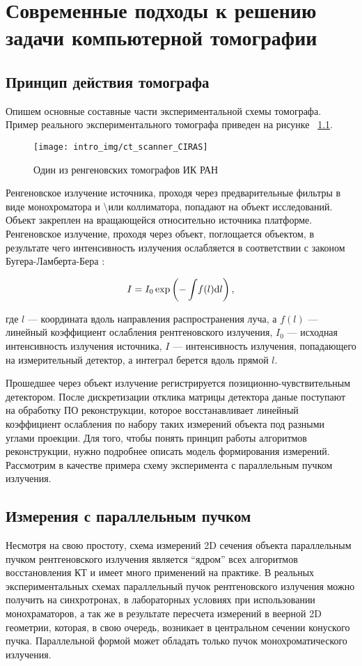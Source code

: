 \chapter{Современные подходы к решению задачи компьютерной томографии}
\section{Принцип действия томографа}
Опишем основные составные части экспериментальной схемы томографа.
Пример реального экспериментального томографа приведен на рисунке ~\ref{fig:ct_scanner}.

\begin{figure}
\centering
\label{fig:ct_scanner}
\texttt{[image: intro\_img/ct\_scanner\_CIRAS]}
\caption{Один из ренгеновских томографов ИК РАН}
\end{figure}

Ренгеновское излучение источника, проходя через предварительные фильтры в виде монохроматора и \textbackslash или коллиматора, попадают на объект исследований.
Объект закреплен на вращающейся относительно источника платформе.
Ренгеновское излучение, проходя через объект, поглощается объектом, в результате чего интенсивность излучения ослабляется в соответствии с законом Бугера-Ламберта-Бера \cite{sivukhin_blb}:

\begin{equation}
\notag
I = I_0 \exp\left( {-\int \! f(l) \mathrm d l }\right),
\end{equation}

где $l$ ---  координата вдоль направления распространения луча, а $f(l)$ --- линейный коэффициент ослабления рентгеновского излучения, $I_0$ --- исходная интенсивность излучения источника, $I$ --- интенсивность излучения, попадающего на измерительный детектор, а интеграл берется вдоль прямой $l$.

Прошедшее через объект излучение регистрируется позиционно-чувствительным детектором.
После дискретизации отклика матрицы детектора даные поступают на обработку ПО реконструкции, которое восстанавливает линейный коэффициент ослабления по набору таких измерений объекта под разными углами проекции.
Для того, чтобы понять принцип работы алгоритмов реконструкции, нужно подробнее описать модель формирования измерений.
Рассмотрим в качестве примера схему эксперимента с параллельным пучком излучения.

\section{Измерения с параллельным пучком}
Несмотря на свою простоту, схема измерений 2D сечения объекта параллельным пучком рентгеновского излучения является ``ядром'' всех алгоритмов восстановления КТ и имеет много применений на практике.
В реальных экспериментальных схемах параллельный пучок рентгеновского излучения можно получить на синхротронах, в лабораторных условиях при использовании монохраматоров, а так же в результате пересчета измерений в веерной 2D геометрии, которая, в свою очередь, возникает в центральном сечении конуского пучка.
Параллельной формой может обладать только пучок монохроматического излучения. 

